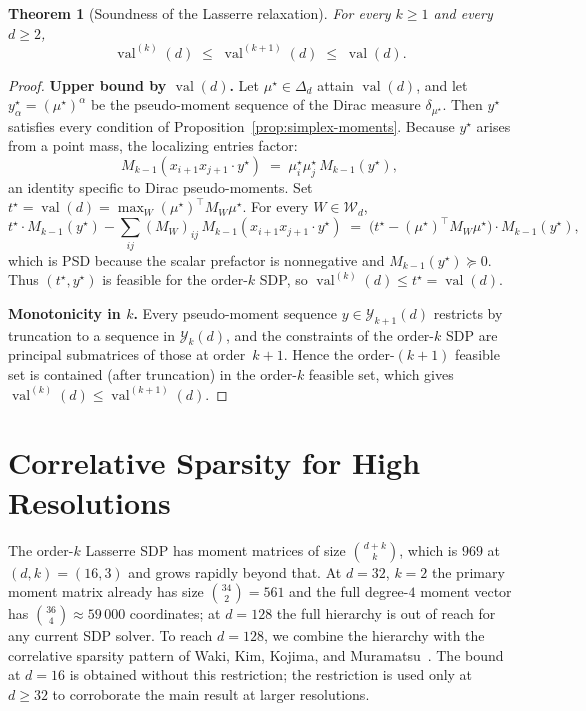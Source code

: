 \documentclass[11pt, letterpaper]{article}
\theoremstyle{paperplain}
\newtheorem{theorem}{Theorem}[section]
\theoremstyle{paperdef}
\newcommand{\val}{\operatorname{val}}
\newcommand{\PSD}{\succeq 0}
\begin{document}
\begin{theorem}[Soundness of the Lasserre relaxation]
\label{thm:lasserre-soundness}
For every $k\ge 1$ and every $d\ge 2$,
\[
  \val^{(k)}(d) \;\le\; \val^{(k+1)}(d) \;\le\; \val(d).
\]
\end{theorem}

\begin{proof}
\textbf{Upper bound by $\val(d)$.}
Let $\mu^\star\in\Delta_d$ attain $\val(d)$, and let
$y^\star_\alpha=(\mu^\star)^\alpha$ be the pseudo-moment sequence
of the Dirac measure $\delta_{\mu^\star}$.  Then $y^\star$
satisfies every condition of Proposition~\ref{prop:simplex-moments}.
Because $y^\star$ arises from a point mass, the localizing entries
factor:
\[
  M_{k-1}(x_{i+1}x_{j+1}\cdot y^\star)
  \;=\;
  \mu^\star_i\mu^\star_j\,M_{k-1}(y^\star),
\]
an identity specific to Dirac pseudo-moments.  Set
$t^\star=\val(d)=\max_W (\mu^\star)^\top M_W\mu^\star$.  For every
$W\in\mathcal{W}_d$,
\[
  t^\star\cdot M_{k-1}(y^\star) - \sum_{ij}(M_W)_{ij}\,M_{k-1}(x_{i+1}x_{j+1}\cdot y^\star)
  \;=\;
  \bigl(t^\star - (\mu^\star)^\top M_W\mu^\star\bigr)\cdot M_{k-1}(y^\star),
\]
which is PSD because the scalar prefactor is nonnegative and
$M_{k-1}(y^\star)\PSD$.  Thus $(t^\star, y^\star)$ is feasible for
the order-$k$ SDP, so $\val^{(k)}(d)\le t^\star=\val(d)$.

\textbf{Monotonicity in $k$.}
Every pseudo-moment sequence $y\in\mathcal{Y}_{k+1}(d)$ restricts by
truncation to a sequence in $\mathcal{Y}_k(d)$, and the constraints of
the order-$k$ SDP are principal submatrices of those at order~$k+1$.
Hence the order-$(k+1)$ feasible set is contained (after truncation)
in the order-$k$ feasible set, which gives
$\val^{(k)}(d)\le\val^{(k+1)}(d)$.
\end{proof}


\section{Correlative Sparsity for High Resolutions}\label{sec:sparsity}

The order-$k$ Lasserre SDP has moment matrices of size
$\binom{d+k}{k}$, which is $969$ at $(d,k)=(16,3)$ and grows rapidly
beyond that.  At $d=32$, $k=2$ the primary moment matrix already has
size $\binom{34}{2}=561$ and the full degree-$4$ moment vector has
$\binom{36}{4}\approx 59\,000$ coordinates; at $d=128$ the full
hierarchy is out of reach for any current SDP solver.  To reach
$d=128$, we combine the hierarchy with the correlative sparsity
pattern of Waki, Kim, Kojima, and Muramatsu~\cite{Waki2006}.  The
bound at $d=16$ is obtained without this restriction; the restriction
is used only at $d\ge 32$ to corroborate the main result at larger
resolutions.
\end{document}
